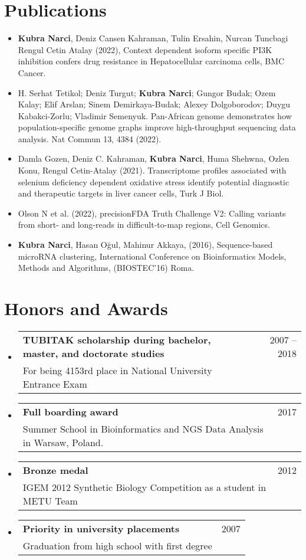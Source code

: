 \documentclass[A4,11pt]{article}
\makeatletter
\newcommand{\CVItem}[1]{
  \item\small{
    {#1 \vspace{-2pt}}
  }
}
\newcommand{\CVSubheading}[4]{
  \vspace{-2pt}\item
    \begin{tabular*}{0.97\textwidth}[t]{l@{\extracolsep{\fill}}r}
      \textbf{#1} & #2 \\
      \small#3 & \small #4 \\
    \end{tabular*}\vspace{-7pt}
}
\newcommand{\CVSubHeadingListStart}{\begin{itemize}[leftmargin=0.5cm, label={}]}
\newcommand{\CVSubHeadingListEnd}{\end{itemize}}
\newcommand{\CVItemListStart}{\begin{itemize}}
\makeatother
\begin{document}
\section{Publications}
  \CVItemListStart
    \CVItem{\textbf{Kubra Narci}, Deniz Cansen Kahraman, Tulin Ersahin, Nurcan Tuncbagi Rengul Cetin Atalay (2022), Context dependent isoform specific PI3K inhibition confers drug resistance in Hepatocellular carcinoma cells, BMC Cancer.}

    \CVItem{H. Serhat Tetikol; Deniz Turgut; \textbf{Kubra Narci}; Gungor Budak; Ozem Kalay; Elif Arslan; Sinem Demirkaya-Budak; Alexey Dolgoborodov; Duygu Kabakci-Zorlu; Vladimir Semenyuk. Pan-African genome demonstrates how population-specific genome graphs improve high-throughput sequencing data analysis. Nat Commun 13, 4384 (2022).}

    \CVItem{Damla Gozen, Deniz C. Kahraman, \textbf{Kubra Narci}, Huma Shehwna, Ozlen Konu, Rengul Cetin-Atalay (2021). Transcriptome profiles associated with selenium deficiency dependent oxidative stress identify potential diagnostic and therapeutic targets in liver cancer cells, Turk J Biol.}

    \CVItem{Olson N et al. (2022), precisionFDA Truth Challenge V2: Calling variants from short- and long-reads in difficult-to-map regions, Cell Genomics.}

    \CVItem{\textbf{Kubra Narci}, Hasan Oğul, Mahinur Akkaya, (2016), Sequence-based microRNA clustering, International Conference on Bioinformatics Models, Methods and Algorithms, (BIOSTEC'16) Roma.}
  \CVSubHeadingListEnd

\section{Honors and Awards}
  \CVSubHeadingListStart
    \CVSubheading
      {TUBITAK scholarship during bachelor, master, and doctorate studies}{2007 -- 2018}
      {For being 4153rd place in National University Entrance Exam}{}
    \CVSubheading
      {Full boarding award}{2017}
      {Summer School in Bioinformatics and NGS Data Analysis in Warsaw, Poland.}{}
    \CVSubheading
      {Bronze medal }{ 2012}
      {IGEM 2012 Synthetic Biology Competition as a student in METU Team}{}
    \CVSubheading
      {Priority in university placements}{2007}
      {Graduation from high school with first degree}{}
  \CVSubHeadingListEnd
\end{document}
